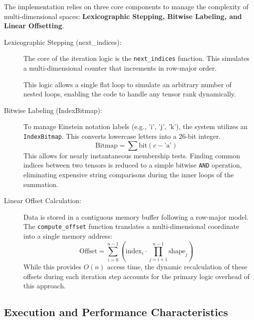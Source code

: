 \documentclass[binding=0.6cm]{sapthesis}
\begin{document}
The implementation relies on three core components to manage the complexity of multi-dimensional spaces: \textbf{Lexicographic Stepping, Bitwise Labeling, and Linear Offsetting}.

\begin{description}
	\item [Lexicographic Stepping (next\_indices):] The core of the iteration logic is the \texttt{next\_indices} function. This simulates a multi-dimensional counter that increments in row-major order.
	      This logic allows a single flat loop to simulate an arbitrary number of nested loops, enabling the code to handle any tensor rank dynamically.

	\item [Bitwise Labeling (IndexBitmap):] To manage Einstein notation labels (e.g., 'i', 'j', 'k'), the system utilizes an \texttt{IndexBitmap}. This converts lowercase letters into a 26-bit integer.
	      \[ \text{Bitmap} = \sum \text{bit}(c - \text{'a'}) \]
	      This allows for nearly instantaneous membership tests. Finding common indices between two tensors is reduced to a simple bitwise \texttt{AND} operation, eliminating expensive string comparisons during the inner loops of the summation.

	\item [Linear Offset Calculation:] Data is stored in a contiguous memory buffer following a row-major model. The \texttt{compute\_offset} function translates a multi-dimensional coordinate into a single memory address:
	      \[ \text{Offset} = \sum_{i=0}^{n-1} \left( \text{index}_i \cdot \prod_{j=i+1}^{n-1} \text{shape}_j \right) \]
	      While this provides $O(n)$ access time, the dynamic recalculation of these offsets during each iteration step accounts for the primary logic overhead of this approach.
\end{description}

\subsection{Execution and Performance Characteristics}
\end{document}
